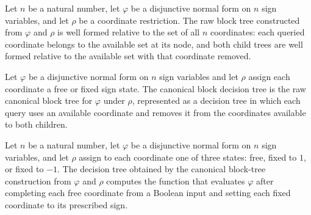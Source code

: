 \begin{theorem}
\label{FABL.DNFFormula.canonicalBlockTreeRaw_wellFormed}
\leanok
{}
Let $n$ be a natural number, let $\varphi$ be a disjunctive normal form on $n$ sign
variables, and let $\rho$ be a coordinate restriction. The raw block tree constructed
from $\varphi$ and $\rho$ is well formed relative to the set of all $n$ coordinates:
each queried coordinate belongs to the available set at its node, and both child trees
are well formed relative to the available set with that coordinate removed.
\end{theorem}

\begin{definition}
\label{FABL.DNFFormula.canonicalBlockTree}
\leanok
{}
Let $\varphi$ be a disjunctive normal form on $n$ sign variables and let $\rho$ assign
each coordinate a free or fixed sign state. The canonical block decision tree is the raw
canonical block tree for $\varphi$ under $\rho$, represented as a decision tree in which
each query uses an available coordinate and removes it from the coordinates available to
both children.
\end{definition}

\begin{theorem}
\label{FABL.DNFFormula.canonicalBlockTree_computes}
\leanok
{}
Let $n$ be a natural number, let $\varphi$ be a disjunctive normal form on $n$ sign
variables, and let $\rho$ assign to each coordinate one of three states: free, fixed to
$1$, or fixed to $-1$. The decision tree obtained by the canonical block-tree
construction from $\varphi$ and $\rho$ computes the function that evaluates $\varphi$
after completing each free coordinate from a Boolean input and setting each fixed
coordinate to its prescribed sign.
\end{theorem}

